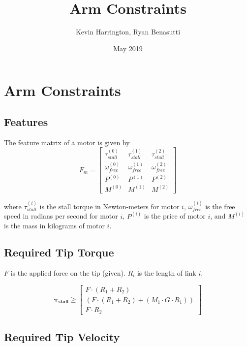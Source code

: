 \documentclass{article}
\title{Arm Constraints}
\author{Kevin Harrington, Ryan Benasutti}
\date{May 2019}
\begin{document}
\maketitle

\FloatBarrier
\section{Arm Constraints}

\FloatBarrier
\subsection{Features}

The feature matrix of a motor is given by
\begin{equation}
    F_m =
    \begin{bmatrix}
        \tau_{stall}^{(0)} & \tau_{stall}^{(1)} & \tau_{stall}^{(2)} \\[6pt]
        \omega_{free}^{(0)} & \omega_{free}^{(1)} & \omega_{free}^{(2)} \\[6pt]
        P^{(0)} & P^{(1)} & P^{(2)} \\[6pt]
        M^{(0)} & M^{(1)} & M^{(2)}
    \end{bmatrix}
\end{equation}

where $\tau_{stall}^{(i)}$ is the stall torque in Newton-meters for motor $i$, $\omega_{free}^{(i)}$
is the free speed in radians per second for motor $i$, $P^{(i)}$ is the price of motor $i$, and
$M^{(i)}$ is the mass in kilograms of motor $i$.

\FloatBarrier
\subsection{Required Tip Torque}

$F$ is the applied force on the tip (given). $R_i$ is the length of link $i$.

\begin{equation}
    \boldsymbol{\tau_{stall}}
    \geq
    \begin{bmatrix}
        F \cdot (R_1 + R_2) \\
        (F \cdot (R_1 + R_2) + (M_1 \cdot G \cdot R_1)) \\
        F \cdot R_2
    \end{bmatrix}
\end{equation}

\FloatBarrier
\subsection{Required Tip Velocity}
\end{document}

